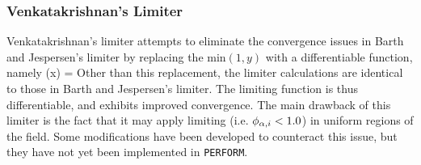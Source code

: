 \subsubsection{Venkatakrishnan's Limiter}

Venkatakrishnan's limiter attempts to eliminate the convergence issues in Barth and Jespersen's limiter by replacing the $\text{min}(1, y)$ with a differentiable function, namely
\be
    \psi(x) = 
\ee
Other than this replacement, the limiter calculations are identical to those in Barth and Jespersen's limiter. The limiting function is thus differentiable, and exhibits improved convergence. The main drawback of this limiter is the fact that it may apply limiting (i.e. $\phi_{\alpha,i} < 1.0$) in uniform regions of the field. Some modifications have been developed to counteract this issue, but they have not yet been implemented in \verb|PERFORM|.


